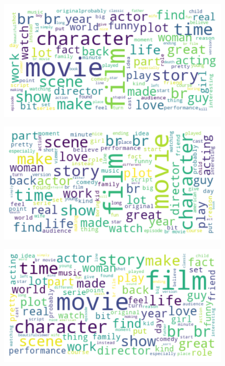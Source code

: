 \documentclass[fleqn,10pt]{SelfArx} %
\begin{document}
\begin{figure}[H]
\begin{center}
  \includegraphics[scale=0.5]{./images/kmeans_wordcloud2.png}
\end{center}
\end{figure}

\begin{figure}[H]
\begin{center}
  \includegraphics[scale=0.5]{./images/kmeans_wordcloud3.png}
\end{center}
\end{figure}

\begin{figure}[H]
\begin{center}
  \includegraphics[scale=0.5]{./images/kmeans_wordcloud4.png}
\end{center}
\end{figure}
\end{document}
